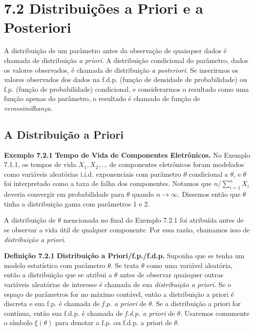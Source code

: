\section*{7.2 Distribuições a Priori e a Posteriori}
A distribuição de um parâmetro antes da observação de quaisquer dados é chamada de distribuição \textit{a priori}. A distribuição condicional do parâmetro, dados os valores observados, é chamada de distribuição \textit{a posteriori}. Se inserirmos os valores observados dos dados na f.d.p. (função de densidade de probabilidade) ou f.p. (função de probabilidade) condicional, e considerarmos o resultado como uma função apenas do parâmetro, o resultado é chamado de função de \textit{verossimilhança}.

\subsection*{A Distribuição a Priori}

\noindent\textbf{Exemplo 7.2.1} \quad \textbf{Tempo de Vida de Componentes Eletrônicos.} No Exemplo 7.1.1, os tempos de vida $X_1, X_2, \dots$ de componentes eletrônicos foram modelados como variáveis aleatórias i.i.d. exponenciais com parâmetro $\theta$ condicional a $\theta$, e $\theta$ foi interpretado como a taxa de falha dos componentes. Notamos que $n/\sum_{i=1}^{n}X_i$ deveria convergir em probabilidade para $\theta$ quando $n \to \infty$. Dissemos então que $\theta$ tinha a distribuição gama com parâmetros 1 e 2.

A distribuição de $\theta$ mencionada no final do Exemplo 7.2.1 foi atribuída antes de se observar a vida útil de qualquer componente. Por essa razão, chamamos isso de \textit{distribuição a priori}.

\vspace{1cm}
\noindent\textbf{Definição 7.2.1} \quad \textbf{Distribuição a Priori/f.p./f.d.p.} Suponha que se tenha um modelo estatístico com parâmetro $\theta$. Se trata $\theta$ como uma variável aleatória, então a distribuição que se atribui a $\theta$ antes de observar quaisquer outras variáveis aleatórias de interesse é chamada de sua \textit{distribuição a priori}. Se o espaço de parâmetros for no máximo contável, então a distribuição a priori é discreta e sua f.p. é chamada de \textit{f.p. a priori} de $\theta$. Se a distribuição a priori for contínua, então sua f.d.p. é chamada de \textit{f.d.p. a priori} de $\theta$. Usaremos comumente o símbolo $\xi(\theta)$ para denotar a f.p. ou f.d.p. a priori de $\theta$.

